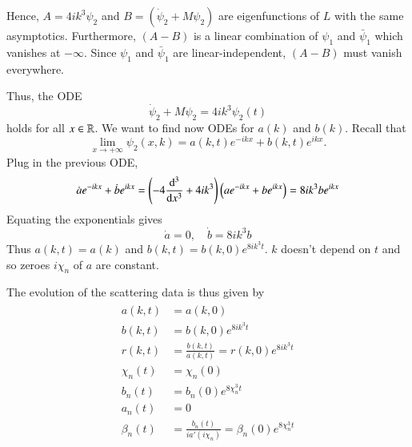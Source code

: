 Hence, $A = 4 i k^3 \psi_2$ and $B = (\dot{\psi}_2 + M\psi_2)$ are eigenfunctions of $L$ with the same asymptotics. Furthermore, $(A-B)$ is a linear combination of $\psi_1$ and $\bar{\psi}_1$ which vanishes at $-\infty$. Since $\psi_1$ and $\bar{\psi}_1$ are linear-independent, $(A-B)$ must vanish everywhere. 

Thus, the ODE 
\begin{equation*}
	\dot\psi_2 + M\psi_2 = 4 ik^3 \psi_2 (t)
\end{equation*}
holds for all $x\in \mathbb{R}$. We want to find now ODEs for $a(k)$ and $b(k)$. Recall that
\begin{equation*}
	\lim_{x\rightarrow +\infty}	\psi_2(x, k) = a(k, t) e^{-ikx} + b(k, t) e^{ikx}.
\end{equation*}
Plug in the previous ODE,
\begin{align*}
	\dot{a} e^{-ikx} + \dot{b} e^{ikx} = \left(- 4 \dv[3]{x} + 4ik^3 \right) \left( a e^{-ikx} + b e^{ikx} \right)  = 8 ik^3 b e^{ikx}
\end{align*}
Equating the exponentials gives 
\begin{equation*}
	\dot{a} = 0, \quad \dot{b} = 8ik^3 b
\end{equation*}
Thus $a(k, t) = a(k)$ and $b(k, t) = b(k, 0) e^{8ik^3 t}$. $k$ doesn't depend on $t$ and so zeroes $i\chi_n$ of $a$ are constant. 

The evolution of the scattering data is thus given by
\begin{align}
	\begin{split}
	a(k, t) &= a(k, 0 ) \\
	b(k, t) &= b(k, 0) e^{8ik^3t} \\
	r(k, t) &= \frac{b(k,t)}{a(k, t)} = r(k, 0) e^{8ik^3 t} \\
	\chi_n(t) &= \chi_n (0) \\
	b_n(t) &= b_n(0) e^{8\chi_n^3 t} \\
	a_n(t) &= 0 \\
	\beta_n(t) &= \frac{b_n(t)}{i a'(i\chi_n)} = \beta_n(0) e^{8\chi_n^3 t}
	\end{split}
	\label{math:2.10}
\end{align}

